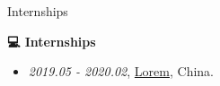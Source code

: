 \begin{section}{Internships}
\label{sec:internships}

\begin{center}
\huge{\textbf{💻 Internships}}
\end{center}

\begin{itemize}
  \item \textit{2019.05 - 2020.02}, \href{https://github.com/}{Lorem}, China.
\end{itemize}
\end{section} 